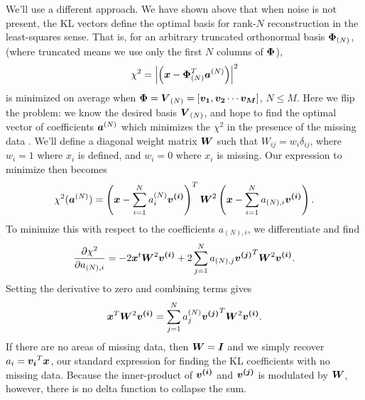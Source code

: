 We'll use a different approach.  We have shown above that when noise is
not present, the KL vectors define the optimal basis for rank-$N$
reconstruction in the least-squares sense.  That is, for an arbitrary
truncated orthonormal basis $\boldsymbol{\Phi}_{(N)}$, (where truncated means
we use only the first $N$ columns of $\boldsymbol{\Phi}$),
\begin{equation}
  \chi^2 = \left|\left(\boldsymbol{x}
  - \boldsymbol{\Phi}_{(N)}^T\boldsymbol{a}^{(N)}\right)\right|^2
\end{equation}
is minimized on average when
$\boldsymbol{\Phi} = \boldsymbol{V}_{(N)}
= [\boldsymbol{v_1}, \boldsymbol{v_2} \cdots \boldsymbol{v_M}]$, $N \le M$.
Here we flip the problem: we know the desired basis $\boldsymbol{V}_{(N)}$,
and hope to find the optimal vector of coefficients $\boldsymbol{a}^{(N)}$
which minimizes the $\chi^2$ in the presence of the missing data
\citep{Connolly99}.
We'll define a 
diagonal weight matrix $\boldsymbol{W}$ such that $W_{ij} = w_i\delta_{ij}$,
where $w_i=1$ where $x_i$ is defined, and $w_i=0$ where $x_i$ is
missing.  Our expression to minimize then becomes
\begin{equation}
  \chi^2(\boldsymbol{a}^{(N)}) = \left(\boldsymbol{x}
  - \sum_{i=1}^N a^{(N)}_i \boldsymbol{v^{(i)}}\right)^T
  \boldsymbol{W}^2 \left(\boldsymbol{x}
  - \sum_{i=1}^N a_{(N),i} \boldsymbol{v^{(i)}}\right).
\end{equation}
To minimize this with respect to the coefficients $a_{(N),i}$, we differentiate
and find
\begin{equation}
  \frac{\partial\chi^2}{\partial a_{(N),i}} = -2 \boldsymbol{x}^t\boldsymbol{W}^2\boldsymbol{v^{(i)}}
  + 2\sum_{j=1}^N a_{(N),j} \boldsymbol{v^{(j)}}^T \boldsymbol{W}^2 \boldsymbol{v^{(i)}}.
\end{equation}
Setting the derivative to zero and combining terms gives
\begin{equation}
  \label{eq:masked_coeff}
  \boldsymbol{x}^T\boldsymbol{W}^2\boldsymbol{v^{(i)}} =
  \sum_{j=1}^N a^{(N)}_j \boldsymbol{v^{(j)}}^T \boldsymbol{W}^2 \boldsymbol{v^{(i)}}.
\end{equation}
If there are no areas of missing data, then $\boldsymbol{W} = \boldsymbol{I}$ and we
simply recover $a_i = \boldsymbol{v_i}^T\boldsymbol{x}$, our standard expression
for finding the KL coefficients with no missing data.
Because the inner-product of
$\boldsymbol{v^{(i)}}$ and $\boldsymbol{v^{(j)}}$ is modulated by $\boldsymbol{W}$, however,
there is no delta function to collapse the sum.

